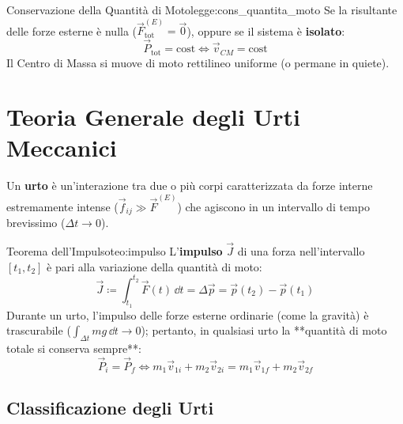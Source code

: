 \begin{legge}{Conservazione della Quantità di Moto}{legge:cons_quantita_moto}
Se la risultante delle forze esterne è nulla ($\vec{F}_{\text{tot}}^{(E)} = \vec{0}$), oppure se il sistema è \textbf{isolato}:
\begin{equation}
    \vec{P}_{\text{tot}} = \text{cost} \iff \vec{v}_{CM} = \text{cost}
    \label{eq:cons_P}
\end{equation}
Il Centro di Massa si muove di moto rettilineo uniforme (o permane in quiete).
\end{legge}

\section{Teoria Generale degli Urti Meccanici}
\label{sec:teoria_urti}

Un \textbf{urto} è un'interazione tra due o più corpi caratterizzata da forze interne estremamente intense ($\vec{f}_{ij} \gg \vec{F}^{(E)}$) che agiscono in un intervallo di tempo brevissimo ($\Delta t \to 0$).

\begin{teorema}{Teorema dell'Impulso}{teo:impulso}
L'\textbf{impulso} $\vec{J}$ di una forza nell'intervallo $[t_1, t_2]$ è pari alla variazione della quantità di moto:
\begin{equation}
    \vec{J} \coloneqq \int_{t_1}^{t_2} \vec{F}(t)\,\dd t = \Delta\vec{p} = \vec{p}(t_2) - \vec{p}(t_1)
\end{equation}
Durante un urto, l'impulso delle forze esterne ordinarie (come la gravità) è trascurabile ($\int_{\Delta t} mg\,\dd t \to 0$); pertanto, in qualsiasi urto la **quantità di moto totale si conserva sempre**:
\begin{equation}
    \vec{P}_i = \vec{P}_f \iff m_1\vec{v}_{1i} + m_2\vec{v}_{2i} = m_1\vec{v}_{1f} + m_2\vec{v}_{2f}
\end{equation}
\end{teorema}

\subsection{Classificazione degli Urti}

